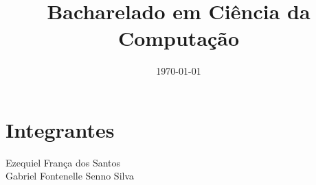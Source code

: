 \documentclass[12pt]{article}
\title{Bacharelado em Ciência da Computação}
\date{\today}
\begin{document}
\maketitle

%

\section*{Integrantes}
Ezequiel França dos Santos\\
Gabriel Fontenelle Senno Silva
\end{document}
